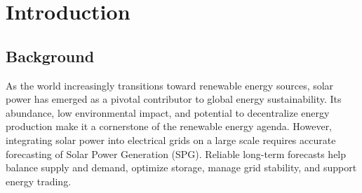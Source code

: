 \documentclass[12pt]{uomthesis}
\begin{document}
\begin{ToC}
\makeatletter
 \makeatother
\end{ToC}

\iffigures
    \begin{LoF}
        \makeatletter
        \makeatother
    \end{LoF}
\fi


\iftables
    \begin{LoT}
    \makeatletter
    \makeatother
    \end{LoT}
\fi

\ifabbrs
    \printacronyms
\fi

\ifappens
    \begin{LoAp}
    \makeatletter
    \makeatother
    \end{LoAp}
\fi

\startContent


\chapter{Introduction}

\section{Background}
As the world increasingly transitions toward renewable energy sources, solar power has emerged as a pivotal contributor to global energy sustainability. Its abundance, low environmental impact, and potential to decentralize energy production make it a cornerstone of the renewable energy agenda. However, integrating solar power into electrical grids on a large scale requires accurate forecasting of Solar Power Generation (SPG). Reliable long-term forecasts help balance supply and demand, optimize storage, manage grid stability, and support energy trading.
\end{document}
